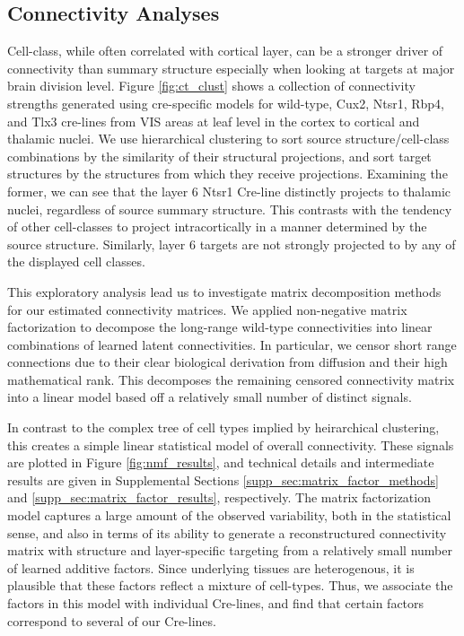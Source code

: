 \newpage

\subsection{Connectivity Analyses}

Cell-class, while often correlated with cortical layer, can be a stronger driver of connectivity than summary structure especially when looking at targets at major brain division level.
Figure \ref{fig:ct_clust} shows a collection of connectivity strengths generated using cre-specific models for wild-type, Cux2, Ntsr1, Rbp4, and Tlx3 cre-lines from VIS areas at leaf level in the cortex to cortical and thalamic nuclei.
We use hierarchical clustering to sort source structure/cell-class combinations by the similarity of their structural projections, and sort target structures by the structures from which they receive projections.
Examining the former, we can see that the layer 6 Ntsr1 Cre-line distinctly projects to thalamic nuclei, regardless of source summary structure.
This contrasts with the tendency of other cell-classes to project intracortically in a manner determined by the source structure.
Similarly, layer 6 targets are not strongly projected to by any of the displayed cell classes.

This exploratory analysis lead us to investigate matrix decomposition methods for our estimated connectivity matrices.
We applied non-negative matrix factorization to decompose the long-range wild-type connectivities into linear combinations of learned latent connectivities.
In particular, we censor short range connections due to their clear biological derivation from diffusion and their high mathematical rank.
This decomposes the remaining censored connectivity matrix into a linear model based off a relatively small number of distinct signals.

In contrast to the complex tree of cell types implied by heirarchical clustering, this creates a simple linear statistical model of overall connectivity.
These signals are plotted in Figure \ref{fig:nmf_results}, and technical details and intermediate results are given in Supplemental Sections \ref{supp_sec:matrix_factor_methods} and \ref{supp_sec:matrix_factor_results}, respectively.
The matrix factorization model captures a large amount of the observed variability, both in the statistical sense, and also in terms of its ability to generate a reconstructured connectivity matrix with structure and layer-specific targeting from a relatively small number of learned additive factors.
Since underlying tissues are heterogenous, it is plausible that these factors reflect a mixture of cell-types.
Thus, we associate the factors in this model with individual Cre-lines, and find that certain factors correspond to several of our Cre-lines.



